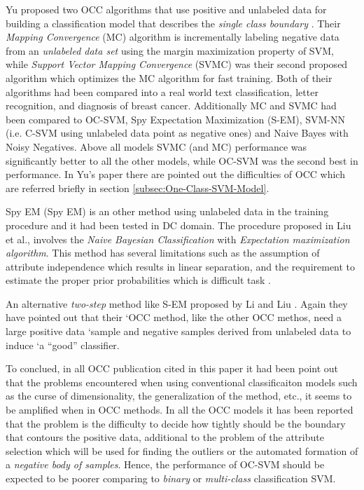 Yu proposed two OCC algorithms that use positive and unlabeled data for building a classification model that describes the \textit{single class boundary} \cite{yu2005single}. Their \textit{Mapping Convergence }(MC) algorithm is incrementally labeling negative data from an \textit{unlabeled data set} using the margin maximization property of SVM, while \textit{Support Vector Mapping Convergence} (SVMC) was their second proposed algorithm which optimizes the MC algorithm for fast training. Both of their algorithms had been compared into a real world text classification, letter recognition, and diagnosis of breast cancer. Additionally MC and SVMC had been compared to OC-SVM, Spy Expectation Maximization (S-EM), SVM-NN (i.e. C-SVM using unlabeled data point as negative ones) and Naive Bayes with Noisy Negatives. Above all models SVMC (and MC) performance was significantly better to all the other models, while OC-SVM was the second best in performance. In Yu's paper there are pointed out the difficulties of OCC which are referred briefly in section \ref{subsec:One-Class-SVM-Model}.

Spy EM (Spy EM) is an other method using unlabeled data in the training procedure and it had been tested in DC domain. The procedure proposed in Liu et al.\cite{liu2002partially}, involves the \textit{Naive Bayesian Classification} with \textit{Expectation maximization algorithm}. This method has several limitations such as the assumption of attribute independence which results in linear separation, and the requirement to estimate the proper prior probabilities which is difficult task \cite{yu2005single}.

An alternative \textit{two-step} method like S-EM proposed by Li and Liu \cite{li2003learning}. Again they have pointed out that their `OCC method, like the other OCC methos, need a large positive data `sample and negative samples derived from unlabeled data to induce `a ``good'' classifier.

To conclued, in all OCC publication cited in this paper it had been point out that the problems encountered when using conventional classificaiton models such as the curse of dimensionality, the generalization of the method, etc., it seems to be amplified when in OCC methods. In all the OCC models it has been reported that the problem is the difficulty to decide how tightly should be the boundary that contours the positive data, additional to the problem of the attribute selection which will be used for finding the outliers or the automated formation of a \textit{negative body of samples}. Hence, the performance of OC-SVM should be expected to be poorer comparing to \textit{binary }or \textit{multi-class} classification SVM\cite{khan2010survey,manevitz2002one,yu2005single,scholkopf1999estimating,li2003learning}.
